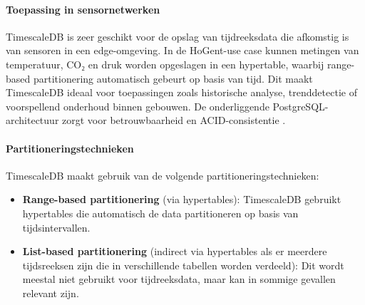 \paragraph{Toepassing in sensornetwerken}  
TimescaleDB is zeer geschikt voor de opslag van tijdreeksdata die afkomstig is van sensoren in een edge-omgeving. In de HoGent-use case kunnen metingen van temperatuur, CO₂ en druk worden opgeslagen in een hypertable, waarbij range-based partitionering automatisch gebeurt op basis van tijd. Dit maakt TimescaleDB ideaal voor toepassingen zoals historische analyse, trenddetectie of voorspellend onderhoud binnen gebouwen. De onderliggende PostgreSQL-architectuur zorgt voor betrouwbaarheid en ACID-consistentie \autocite{TimescaleDBDocumentation, Kleppmann2017}.

\paragraph{Partitioneringstechnieken}  
TimescaleDB maakt gebruik van de volgende partitioneringstechnieken:
\begin{itemize}
    \item \textbf{Range-based partitionering} (via hypertables): TimescaleDB gebruikt hypertables die automatisch de data partitioneren op basis van tijdsintervallen.
    \item \textbf{List-based partitionering} (indirect via hypertables als er meerdere tijdsreeksen zijn die in verschillende tabellen worden verdeeld): Dit wordt meestal niet gebruikt voor tijdreeksdata, maar kan in sommige gevallen relevant zijn.
\end{itemize}

\begin{table}[H]
    \centering
    \caption{Overzicht van de specificaties van TimescaleDB. \cite{TimescaleDBDocumentation}}
\end{table}

